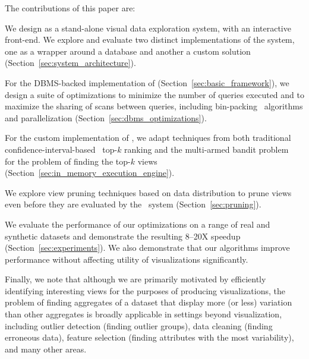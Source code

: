 The contributions of this paper are:
\begin{denselist}
  \item We design \VizRecDB as a stand-alone visual data exploration system,
  with an interactive front-end. We explore and evaluate two distinct implementations of the system, one as a
  wrapper around a database and another a custom solution (Section~\ref{sec:system_architecture}).
  \item For the DBMS-backed implementation of \VizRecDB (Section~\ref{sec:basic_framework}), we
  design a suite of optimizations to minimize the number of queries executed and to
  maximize the sharing of scans between queries, 
  including bin-packing~\cite{garey} algorithms and parallelization
  (Section~\ref{sec:dbms_optimizations}).
  \item For the custom implementation of \VizRecDB,  we adapt techniques 
  from both traditional confidence-interval-based~\cite{hoeffding1963probability} top-$k$ ranking and the
   multi-armed bandit problem~\cite{bandits} 
   for the problem of finding the top-$k$ views (Section~\ref{sec:in_memory_execution_engine}).
  \item We explore view pruning techniques based on data distribution
  to prune views even before they are evaluated by the \VizRecDB\ system 
  (Section~\ref{sec:pruning}).
  \item We evaluate the performance of our optimizations on a range of
  real and synthetic datasets and demonstrate the resulting 8--20X speedup 
  (Section~\ref{sec:experiments}). We also demonstrate that our algorithms
  improve performance without affecting utility of visualizations significantly.
\end{denselist}
Finally, we note that although we are primarily motivated by efficiently 
identifying interesting views for the purposes of producing visualizations, 
the problem of finding aggregates of a dataset that display more (or less) variation
than other aggregates is broadly applicable in settings beyond visualization, including
outlier detection (finding outlier groups), data cleaning (finding erroneous 
data), feature selection (finding attributes with the most variability), and 
many other areas.






